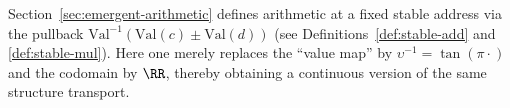 \begin{remark}\label{rem:unit-circle-phase-transport-analogy}
Section~\ref{sec:emergent-arithmetic} defines arithmetic at a fixed stable address via the pullback \( \mathrm{Val}^{-1}(\mathrm{Val}(c)\pm\mathrm{Val}(d)) \) (see Definitions~\ref{def:stable-add} and \ref{def:stable-mul}).
Here one merely replaces the ``value map'' by \(\upsilon^{-1}=\tan(\pi\cdot)\) and the codomain by \(\RR\), thereby obtaining a continuous version of the same structure transport.
\end{remark}
